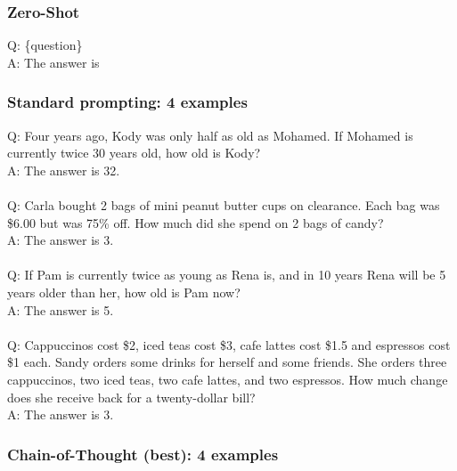 \subsubsection{Zero-Shot}

Q: \{question\}\\
A: The answer is

\subsubsection{Standard prompting: 4 examples}
Q: Four years ago, Kody was only half as old as Mohamed. If Mohamed is currently twice 30 years old, how old is Kody? \\
A: The answer is 32. \\
 \\
Q: Carla bought 2 bags of mini peanut butter cups on clearance. Each bag was \$6.00 but was 75\% off. How much did she spend on 2 bags of candy? \\
A: The answer is 3. \\
 \\
Q: If Pam is currently twice as young as Rena is, and in 10 years Rena will be 5 years older than her, how old is Pam now? \\
A: The answer is 5. \\
 \\
Q: Cappuccinos cost \$2, iced teas cost \$3, cafe lattes cost \$1.5 and espressos cost \$1 each. Sandy orders some drinks for herself and some friends. She orders three cappuccinos, two iced teas, two cafe lattes, and two espressos. How much change does she receive back for a twenty-dollar bill? \\
A: The answer is 3. \\

\subsubsection{Chain-of-Thought (best): 4 examples}

